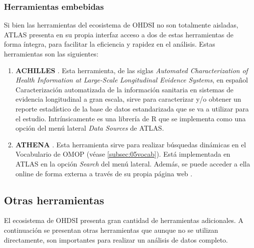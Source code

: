 \subsubsection{Herramientas embebidas}

Si bien las herramientas del ecosistema de OHDSI no son totalmente aisladas, ATLAS presenta en su propia interfaz acceso a dos de estas herramientas de forma íntegra, para facilitar la eficiencia y rapidez en el análisis. Estas herramientas son las siguientes:

\begin{enumerate}[label=\alph*.]

    \item \textbf{ACHILLES} \cite{githubACHILLES}. Esta herramienta, de las siglas \textit{Automated Characterization of Health Information at Large-Scale Longitudinal Evidence Systems}, en español Caracterización automatizada de la información sanitaria en sistemas de evidencia longitudinal a gran escala, sirve para caracterizar y/o obtener un reporte estadístico de la base de datos estandarizada que se va a utilizar para el estudio. Intrínsicamente es una librería de R que se implementa como una opción del menú lateral \textit{Data Sources} de ATLAS.
    \item \textbf{ATHENA} \cite{githubATHENA}. Esta herramienta sirve para realizar búsquedas dinámicas en el Vocabulario de OMOP (véase \ref{subsec:05vocab}). Está implementada en ATLAS en la opción \textit{Search} del menú lateral. Además, se puede acceder a ella online de forma externa a través de su propia página web \cite{ATHENAweb}.
    
\end{enumerate}


\subsection{Otras herramientas} \label{subsec:05otrasHerramientas}

El ecosistema de OHDSI presenta gran cantidad de herramientas adicionales. A continuación se presentan otras herramientas que aunque no se utilizan directamente, son importantes para realizar un análisis de datos completo. 

